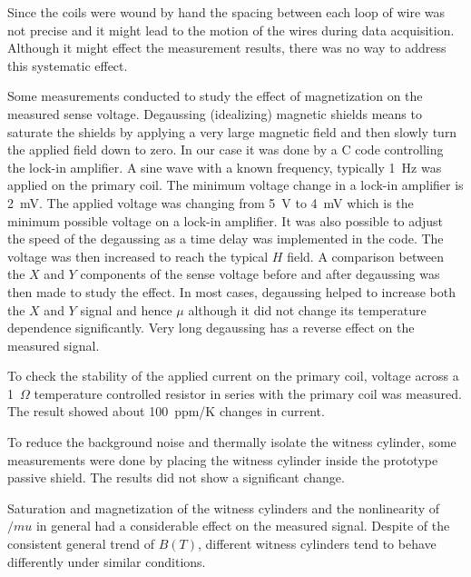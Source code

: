 Since the coils were wound by hand the spacing between each loop of wire was not precise and it might lead to the motion of the wires during data acquisition. Although it might effect the measurement results, there was no way to address this systematic effect.


Some measurements conducted to study the effect of magnetization on the measured sense voltage. Degaussing
(idealizing) magnetic shields means to saturate the shields by
applying a very large magnetic field and then slowly turn the
applied field down to zero. In our case it was done by a C code controlling the lock-in amplifier. A sine wave with a known frequency, typically 1~Hz was applied on the primary coil. The minimum voltage change in a lock-in amplifier is 2~mV. The applied voltage was changing from 5~V to 4~mV which is the minimum possible voltage on a lock-in amplifier. It was also possible to adjust the speed of the degaussing as a time delay was implemented in the code.
The voltage was then increased to reach the typical $H$ field.
A comparison between the $X$ and $Y$ components of the sense voltage before and after degaussing was then made to study the effect.
In most cases, degaussing helped to
increase both the $X$ and $Y$ signal and hence $\mu$ although it did not change its temperature dependence significantly. Very long degaussing has a reverse effect on the measured signal.


To check the stability of the applied current on the primary coil, voltage across a 1~$\Omega$ temperature controlled resistor in series with the primary coil was measured. The result showed about 100~ppm/K changes in current.

To reduce the background noise and
thermally isolate the witness cylinder, some measurements were done by
placing the witness cylinder inside the prototype passive shield. The
results did not show a significant change.


Saturation and magnetization of the witness cylinders and the nonlinearity of $/mu$ in general had
a considerable effect on the measured signal. Despite of the consistent general trend of $B(T)$, different witness cylinders tend to behave differently under similar conditions. 












